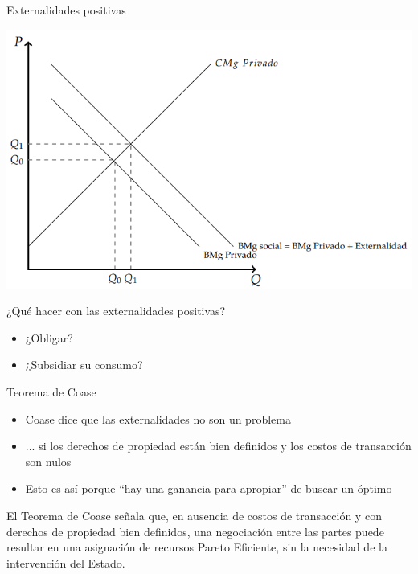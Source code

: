 \documentclass{beamer}
\begin{document}

\begin{frame}{Externalidades positivas}
    \begin{center}
        \includegraphics[scale=0.7]{../Figures/C25.1.png}
    \end{center}
\end{frame}

\begin{frame}{¿Qué hacer con las externalidades positivas?}
    \begin{itemize}
        \item ¿Obligar?
        \item ¿Subsidiar su consumo?
    \end{itemize}
\end{frame}

\begin{frame}{Teorema de Coase}
    \begin{itemize}
        \item Coase dice que las externalidades no son un problema
        \item ... si los derechos de propiedad están bien definidos y los costos de transacción son nulos
        \item Esto es así porque ``hay una ganancia para apropiar'' de buscar un óptimo 
    \end{itemize}
    \begin{boxA}
        \centering
        El Teorema de Coase señala que, en ausencia de costos de transacción y con derechos de propiedad bien definidos, una negociación
        entre las partes puede resultar en una asignación de recursos
        Pareto Eficiente, sin la necesidad de la intervención del Estado.
    \end{boxA}
\end{frame}
\end{document}
